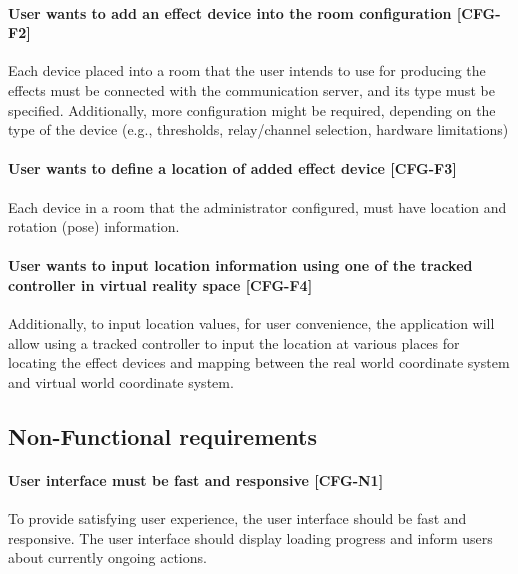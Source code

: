 \hypertarget{x-\textbf{user-wants-to-add-an-effect-device-into-the-configuration}-[cfg-f2]}{\paragraph*{\textbf{User wants to add an effect device into the room configuration} [CFG-F2]}}
Each device placed into a room that the user intends to use for producing the effects
must be connected with the communication server, and its type must be specified.
Additionally, more configuration might be required, depending on the type
of the device (e.g., thresholds, relay/channel selection, hardware limitations)


\hypertarget{x-\textbf{user-wants-to-define-a-location-of-added-effect-device}-[cfg-f3]}{\paragraph*{\textbf{User wants to define a location of added effect device} [CFG-F3]}}
Each device in a room that the administrator configured,
must have location and rotation (pose) information.


\hypertarget{x-\textbf{user-wants-to-input-location-information-using-one-of-the-tracked-controller-in-virtual-reality-space}-[cfg-f4]}{\paragraph*{\textbf{User wants to input location information using one of the tracked controller in virtual reality space} [CFG-F4]}}
Additionally, to input location values, for user convenience,
the application will allow using a tracked controller to input the location at
various places for locating the effect
devices and mapping between the real world coordinate system and virtual
world coordinate system.


\subsection{Non-Functional requirements}
\hypertarget{x-\textbf{user-interface-must-be-fast-and-responsive}-[cfg-n1]}{\paragraph*{\textbf{User interface must be fast and responsive} [CFG-N1]}}
To provide satisfying user experience, the user interface should be fast and
responsive. The user interface should display loading progress and inform users
about currently ongoing actions.


